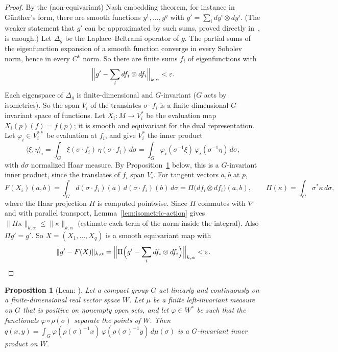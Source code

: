 \documentclass[11pt]{amsart}
\newtheorem{proposition}[theorem]{Proposition}
\theoremstyle{definition}
\newcommand{\inner}[2]{\langle #1, #2\rangle}
\newcommand{\lean}[1]{\texttt{\detokenize{#1}}}
\begin{document}
\begin{proof}
By the (non-equivariant) Nash embedding theorem, for instance in G\"unther's form, there are
smooth functions $y^1,\dots,y^q$ with $g'=\sum_i dy^i\otimes dy^i$. (The weaker statement that
$g'$ can be approximated by such sums, proved directly in~\cite[p.~58]{Nash56}, is enough.) Let
$\Delta_g$ be the Laplace--Beltrami operator of $g$. The partial sums of the eigenfunction
expansion of a smooth function converge in every Sobolev norm, hence in every $C^{k}$ norm. So
there are finite sums $f_i$ of eigenfunctions with
\[
\Bigl\|g'-\sum_i df_i\otimes df_i\Bigr\|_{k,\alpha}<\varepsilon .
\]
Each eigenspace of $\Delta_g$ is finite-dimensional and $G$-invariant ($G$ acts by isometries). So
the span $V_i$ of the translates $\sigma\cdot f_i$ is a finite-dimensional $G$-invariant space of
functions. Let $X_i\colon M\to V_i^*$ be the evaluation map $X_i(p)(f)=f(p)$; it is smooth and
equivariant for the dual representation. Let $\varphi_i\in V_i^{**}$ be evaluation at $f_i$, and
give $V_i^*$ the inner product
\begin{equation}\label{eq:averaged-ip}
\inner{\xi}{\eta}_i = \int_G\xi(\sigma\cdot f_i)\,\eta(\sigma\cdot f_i)\,d\sigma
= \int_G \varphi_i(\sigma^{-1}\xi)\,\varphi_i(\sigma^{-1}\eta)\,d\sigma,
\end{equation}
with $d\sigma$ normalized Haar measure. By Proposition~\ref{prop:avg-ip} below, this is a
$G$-invariant inner product, since the translates of $f_i$ span $V_i$. For tangent vectors $a,b$
at $p$,
\[
F(X_i)(a,b) = \int_G d(\sigma\cdot f_i)(a)\,d(\sigma\cdot f_i)(b)\,d\sigma
= \Pi\bigl(df_i\otimes df_i\bigr)(a,b),\qquad \Pi(\kappa)=\int_G\sigma^*\kappa\,d\sigma,
\]
where the Haar projection $\Pi$ is computed pointwise. Since $\Pi$ commutes with $\nabla$ and with
parallel transport, Lemma~\ref{lem:isometric-action} gives $\|\Pi\kappa\|_{k,\alpha}\le\|\kappa\|_{k,\alpha}$ (estimate each term of the norm inside the integral).
Also $\Pi g'=g'$. So $X=(X_1,\dots,X_q)$ is a smooth equivariant map with
\[
\|g'-F(X)\|_{k,\alpha}=\Bigl\|\Pi\Bigl(g'-\sum_idf_i\otimes df_i\Bigr)\Bigr\|_{k,\alpha}<\varepsilon .
\qedhere
\]
\end{proof}

\begin{proposition}[Lean: \lean{haar_averaged_inner_product}]\label{prop:avg-ip}
Let a compact group $G$ act linearly and continuously on a finite-dimensional real vector space
$W$. Let $\mu$ be a finite left-invariant measure on $G$ that is positive on nonempty open sets,
and let $\varphi\in W^*$ be such that the functionals $\varphi\circ\rho(\sigma)$ separate the
points of $W$. Then
$q(x,y)=\int_G\varphi(\rho(\sigma)^{-1}x)\,\varphi(\rho(\sigma)^{-1}y)\,d\mu(\sigma)$ is a
$G$-invariant inner product on $W$.
\end{proposition}
\end{document}
